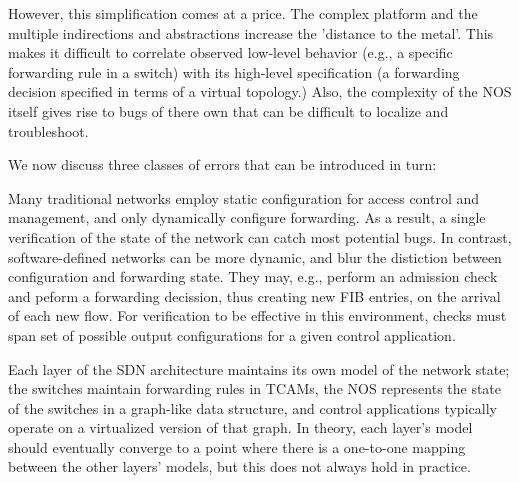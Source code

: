 However, this simplification comes at a price. The complex platform
and the multiple indirections and abstractions increase the 'distance to
the metal'. This makes it difficult to correlate observed low-level behavior
(e.g., a specific forwarding rule in a switch) with its high-level specification
(a forwarding decision specified in terms of a virtual topology.) Also, the
complexity of the NOS itself gives rise to bugs of there own that can be
difficult to localize and troubleshoot. 

We now discuss three classes of errors that can be introduced in turn:

 Many traditional networks employ static configuration
for access control and management, and only dynamically configure forwarding.
As a result, a single verification of the state of the network can catch most potential bugs. 
In contrast, software-defined networks can be more dynamic, and blur the distiction between configuration
and forwarding state. They may, e.g., perform an admission check and peform a forwarding decission, 
thus creating new FIB entries, on the arrival of each new flow.  For verification to be
effective in this environment, checks must span set of possible output configurations for a given control
application.

  Each layer of the SDN architecture
maintains its own model of the network state; the switches maintain forwarding
rules in TCAMs, the NOS represents the state of the switches in a graph-like data
structure, and control applications typically operate on 
a virtualized version of that graph. In theory, each layer's model should eventually
converge to a point where there is a one-to-one mapping 
between the other layers' models, but this does not always hold in practice.

